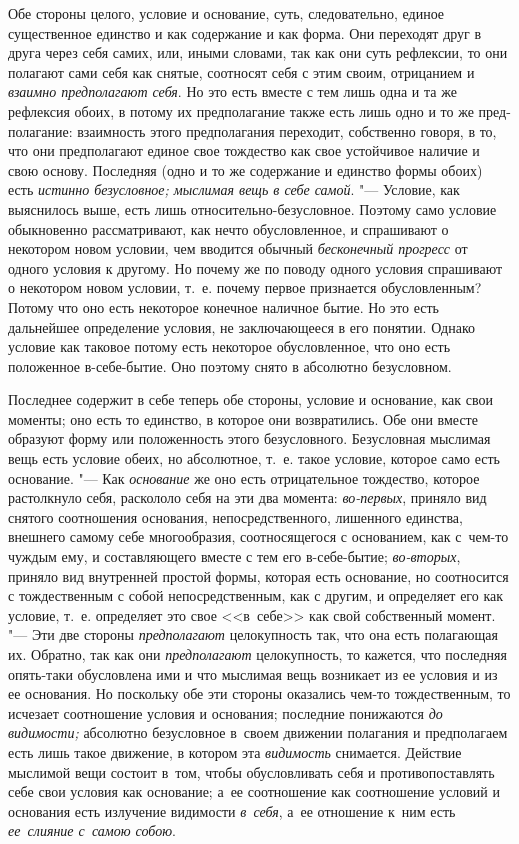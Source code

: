 Обе стороны целого, условие и основание, суть, следовательно, единое
существенное единство и как содержание и как форма. Они переходят друг в
друга через себя самих, или, иными словами, так как они суть рефлексии, то
они полагают сами себя как снятые, соотносят себя с этим своим, отрицанием
и {\em взаимно предполагают себя}. Но это есть вместе с
тем лишь одна и та же рефлексия обоих, в потому их предполагание также есть
лишь одно и то же пред- полагание: взаимность этого предполагания
переходит, собственно говоря, в то, что они предполагают единое свое
тождество как свое устойчивое наличие и свою основу. Последняя (одно и то
же содержание и единство формы обоих) есть {\em истинно
безусловное; мыслимая вещь в себе самой}. "--- Условие, как выяснилось выше,
есть лишь относительно-безусловное. Поэтому само условие обыкновенно
рассматривают, как нечто обусловленное, и спрашивают о некотором новом
условии, чем вводится обычный {\em бесконечный
прогресс} от одного условия к другому. Но почему же по поводу одного
условия спрашивают о некотором новом условии, т.~е. почему первое
признается обусловленным? Потому что оно есть некоторое конечное наличное
бытие. Но это есть дальнейшее определение условия, не заключающееся в его
понятии. Однако условие как таковое потому есть некоторое обусловленное,
что оно есть положенное в-себе-бытие. Оно поэтому снято в абсолютно
безусловном.

Последнее содержит в себе теперь обе стороны, условие и основание, как свои
моменты; оно есть то единство, в которое они возвратились. Обе они вместе
образуют форму или положенность этого безусловного. Безусловная мыслимая вещь
есть условие обеих, но абсолютное, т.~е. такое условие, которое само есть
основание. "--- Как {\em основание} же оно есть отрицательное тождество,
которое растолкнуло себя, раскололо себя на эти два момента: {\em во-первых},
приняло вид снятого соотношения основания, непосредственного, лишенного
единства, внешнего самому себе многообразия, соотносящегося с основанием, как
с~чем-то чуждым ему, и составляющего вместе с тем его в-себе-бытие;
{\em во-вторых}, приняло вид внутренней простой формы, которая есть основание,
но соотносится с тождественным с собой непосредственным, как с другим, и
определяет его как условие, т.~е. определяет это свое <<в~себе>> как свой
собственный момент. "--- Эти две стороны {\em предполагают} целокупность так,
что она есть полагающая их. Обратно, так как они {\em предполагают}
целокупность, то кажется, что последняя опять-таки обусловлена ими и что
мыслимая вещь возникает из ее условия и из ее основания. Но поскольку обе эти
стороны оказались чем-то тождественным, то исчезает соотношение условия и
основания; последние понижаются {\em до видимости;} абсолютно безусловное
в~своем движении полагания и предполагаем есть лишь такое движение, в котором
эта {\em видимость} снимается. Действие мыслимой вещи состоит в~том, чтобы
обусловливать себя и противопоставлять себе свои условия как основание; а~ее
соотношение как соотношение условий и основания есть излучение видимости
{\em в~себя}, а~ее отношение к~ним есть {\em ее~слияние с~самою собою}.


